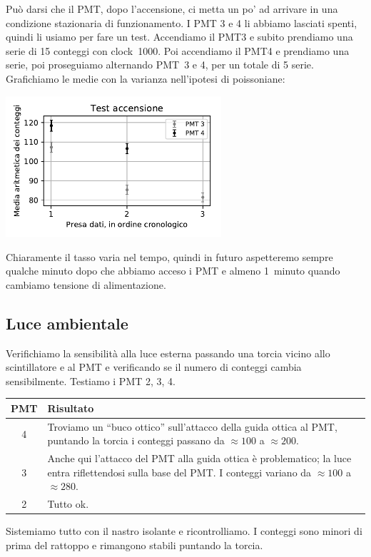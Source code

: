 \documentclass[a4paper]{article}
\begin{document}
Può darsi che il PMT, dopo l'accensione, ci metta un po' ad arrivare in una condizione stazionaria di funzionamento.
I PMT 3 e 4 li abbiamo lasciati spenti, quindi li usiamo per fare un test.
Accendiamo il PMT3 e subito prendiamo una serie di 15 conteggi con clock~1000.
Poi accendiamo il PMT4 e prendiamo una serie, poi proseguiamo alternando PMT~3 e 4,
per un totale di 5 serie. Grafichiamo le medie con la varianza nell'ipotesi di poissoniane:
\begin{center}
	\includegraphics[width=8cm]{fig6c}
\end{center}
Chiaramente il tasso varia nel tempo, quindi in futuro aspetteremo sempre qualche minuto dopo che abbiamo acceso i PMT e almeno 1~minuto quando cambiamo tensione di alimentazione.

\subsection*{Luce ambientale}

Verifichiamo la sensibilità alla luce esterna passando una torcia vicino allo scintillatore e al PMT e verificando se il numero di conteggi cambia sensibilmente.
Testiamo i PMT 2, 3, 4.
\begin{center}
\begin{tabular}{c|p{50ex}}
	PMT & Risultato \\
	\hline
	4 &
	Troviamo un ``buco ottico'' sull'attacco della guida ottica al PMT,
	puntando la torcia i conteggi passano da $\approx 100$ a $\approx 200$. \\
	3 &
	Anche qui l'attacco del PMT alla guida ottica è problematico;
	la luce entra riflettendosi sulla base del PMT.
	I conteggi variano da $\approx 100$ a $\approx 280$.\\
	2 &
	Tutto ok.
\end{tabular}
\end{center}
Sistemiamo tutto con il nastro isolante e ricontrolliamo.
I conteggi sono minori di prima del rattoppo e rimangono stabili puntando la torcia.
\end{document}
